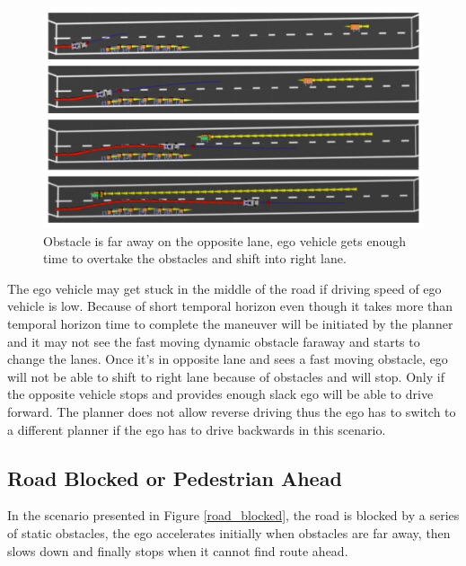\begin{figure}
	\centering
	\includegraphics[width=1.0\textwidth]{Images/evaluation/vehicle_opp_2.jpg}
	\caption{Obstacle is far away on the opposite lane, ego vehicle gets enough time to overtake the obstacles and shift into right lane.}
	\label{series_obstacles_2}
\end{figure}

The ego vehicle may get stuck in the middle of the road if driving speed of ego vehicle is low. Because of short temporal horizon even though it takes more than temporal horizon time to complete the maneuver will be initiated by the planner and it may not see the fast moving dynamic obstacle faraway and starts to change the lanes. Once it's in opposite lane and sees a fast moving obstacle, ego will not be able to shift to right lane because of obstacles and will stop. Only if the opposite vehicle stops and provides enough slack ego will be able to drive forward. The planner does not allow reverse driving thus the ego has to switch to a different planner if the ego has to drive backwards in this scenario. 


\subsection{Road Blocked or Pedestrian Ahead}

In the scenario presented in Figure \ref{road_blocked}, the road is blocked by a series of static obstacles, the ego accelerates initially when obstacles are far away, then slows down and finally stops when it cannot find route ahead. 

